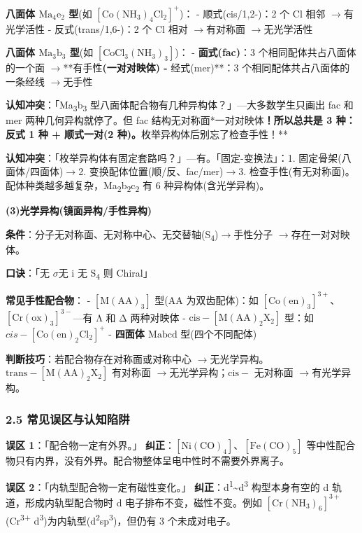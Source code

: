 \documentclass[a4paper,11pt]{ctexart}
\newcommand{\箭}{\ensuremath{\rightarrow}}
\newcommand{\左箭}{\ensuremath{\leftarrow}}
\newcommand{\上箭}{\ensuremath{\uparrow}}
\newcommand{\下箭}{\ensuremath{\downarrow}}
\newcommand{\衡}{\ensuremath{\rightleftharpoons}}
\newcommand{\双箭}{\ensuremath{\leftrightarrow}}
\newcommand{\约等于}{\ensuremath{\approx}}
\newcommand{\小于等于}{\ensuremath{\leq}}
\newcommand{\大于等于}{\ensuremath{\geq}}
\newcommand{\不等于}{\ensuremath{\neq}}
\newcommand{\西格马}{\ensuremath{\sigma}}
\newcommand{\派}{\ensuremath{\pi}}
\begin{document}
\textbf{八面体 \(\mathrm{Ma_4e_2}\) 型}(如 \([\mathrm{Co(NH_3)_4Cl_2}]^+\))：
- 顺式(cis/1,2-)：2 个 Cl 相邻 \箭 有光学活性
- 反式(trans/1,6-)：2 个 Cl 相对 \箭 有对称面 \箭 无光学活性

\textbf{八面体 \(\mathrm{Ma_3b_3}\) 型}(如 \([\mathrm{CoCl_3(NH_3)_3}]\))：
- \textbf{面式(fac)}：3 个相同配体共占八面体的一个面 \箭 **有手性\textbf{(一对对映体)
- }经式(mer)**：3 个相同配体共占八面体的一条经线 \箭 无手性

\textbf{认知冲突}：「Ma\textsubscript{3}b\textsubscript{3} 型八面体配合物有几种异构体？」---大多数学生只画出 fac 和 mer 两种几何异构就停了。但 fac 结构无对称面*一对对映体\textbf{！所以总共是 3 种：反式 1 种 + 顺式一对(2 种)。}枚举异构体后别忘了检查手性！**

\textbf{认知冲突}：「枚举异构体有固定套路吗？」---有。「固定-变换法」：1. 固定骨架(八面体/四面体)\箭 2. 变换配体位置(顺/反、fac/mer)\箭 3. 检查手性(有无对称面)。配体种类越多越复杂，Ma\textsubscript{2}b\textsubscript{2}c\textsubscript{2} 有 6 种异构体(含光学异构)。

\textbf{(3)光学异构(镜面异构/手性异构)}

\textbf{条件}：分子无对称面、无对称中心、无交替轴(S\textsubscript{4})\箭 手性分子 \箭 存在一对对映体。

\textbf{口诀}：「无 \西格马 无 i 无 S\textsubscript{4} 则 Chiral」

\textbf{常见手性配合物}：
- \(\mathrm{[M(AA)_3]}\) 型(AA 为双齿配体)：如 \([\mathrm{Co(en)_3}]^{3+}\)、\([\mathrm{Cr(ox)_3}]^{3-}\)---有 Λ 和 Δ 两种对映体
- \(\mathrm{cis-[M(AA)_2X_2]}\) 型：如 \(cis-[\mathrm{Co(en)_2Cl_2}]^+\)
- \textbf{四面体 \(\mathrm{Mabcd}\)} 型(四个不同配体)

\textbf{判断技巧}：若配合物存在对称面或对称中心 \箭 无光学异构。\(\mathrm{trans-[M(AA)_2X_2]}\) 有对称面 \箭 无光学异构；\(\mathrm{cis-}\) 无对称面 \箭 有光学异构。

\subsubsection{2.5 常见误区与认知陷阱}\label{ux5e38ux89c1ux8befux533aux4e0eux8ba4ux77e5ux9677ux9631}

\textbf{误区 1}：「配合物一定有外界。」
\textbf{纠正}：\(\mathrm{[Ni(CO)_4]}\)、\(\mathrm{[Fe(CO)_5]}\) 等中性配合物只有内界，没有外界。配合物整体呈电中性时不需要外界离子。

\textbf{误区 2}：「内轨型配合物一定有磁性变化。」
\textbf{纠正}：d\textsuperscript{1}\textasciitilde d\textsuperscript{3} 构型本身有空的 d 轨道，形成内轨型配合物时 d 电子排布不变，磁性不变。例如 \([\mathrm{Cr(NH_3)_6}]^{3+}\)(Cr\textsuperscript{3+} d\textsuperscript{3})为内轨型(d\textsuperscript{2}sp\textsuperscript{3})，但仍有 3 个未成对电子。
\end{document}
